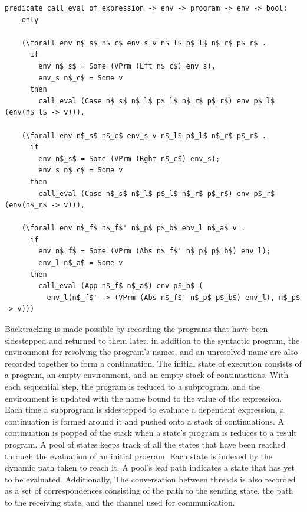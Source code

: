 \documentclass{article}
\begin{document}
\begin{lstlisting}[language=logic, mathescape]
  predicate call_eval of expression -> env -> program -> env -> bool:
    only

    (\forall env n$_s$ n$_c$ env_s v n$_l$ p$_l$ n$_r$ p$_r$ .
      if
        env n$_s$ = Some (VPrm (Lft n$_c$) env_s),
        env_s n$_c$ = Some v
      then
        call_eval (Case n$_s$ n$_l$ p$_l$ n$_r$ p$_r$) env p$_l$ (env(n$_l$ -> v))),

    (\forall env n$_s$ n$_c$ env_s v n$_l$ p$_l$ n$_r$ p$_r$ .
      if 
        env n$_s$ = Some (VPrm (Rght n$_c$) env_s); 
        env_s n$_c$ = Some v
      then
        call_eval (Case n$_s$ n$_l$ p$_l$ n$_r$ p$_r$) env p$_r$ (env(n$_r$ -> v))),

    (\forall env n$_f$ n$_f$' n$_p$ p$_b$ env_l n$_a$ v .
      if 
        env n$_f$ = Some (VPrm (Abs n$_f$' n$_p$ p$_b$) env_l); 
        env_l n$_a$ = Some v
      then
        call_eval (App n$_f$ n$_a$) env p$_b$ (
          env_l(n$_f$' -> (VPrm (Abs n$_f$' n$_p$ p$_b$) env_l), n$_p$ -> v)))
  \end{lstlisting}
  

Backtracking is made possible by recording the programs that have been sidestepped and
returned to them later. in addition to the syntactic program, the environment for resolving the
program's names, and an unresolved name are also recorded together to form a continuation. 
The initial state of execution consists of a program, an empty environment, and an empty stack
of continuations. With each sequential step, the program is reduced to a subprogram, and the
environment is updated with the name bound to the value of the expression. Each time a
subprogram is sidestepped to evaluate a dependent expression, a continuation is formed around
it and pushed onto a stack of continuations. A continuation is popped of the stack when a
state's program is reduces to a result program.  A pool of states keeps track of all the states
that have been reached through the evaluation of an initial program.  Each state is indexed by
the dynamic path taken to reach it. A pool's leaf path indicates a state that has yet to be
evaluated. Additionally, The conversation between threads is also recorded as a set of
correspondences consisting of the path to the sending state, the path to the receiving state,
and the channel used for communication.  
\end{document}
